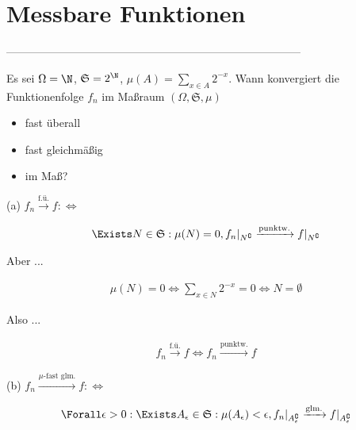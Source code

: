 \setcounter{exercise}{0}

\section{Messbare Funktionen}

--------------------------------------------------------------------------------

\begin{exercise}

Es sei $\Omega = \N$, $\mathfrak{S} = 2^\N$, $\mu(A) = \sum_{x \in A} 2^{-x}$. Wann konvergiert die Funktionenfolge $f_n$ im Maßraum $(\Omega, \mathfrak{S}, \mu)$

\begin{itemize}
  \item[(a)] fast überall
  \item[(b)] fast gleichmäßig
  \item[(c)] im Maß?
\end{itemize}

\end{exercise}

\begin{solution}

(a) $f_n \xrightarrow{\text{f.ü.}} f : \Leftrightarrow$

\begin{align*}
  \Exists N \in \mathfrak{S}:
  \mu(N) = 0,
  f_n|_{N^\complement} \xrightarrow{\text{punktw.}} f|_{N^\complement}
\end{align*}

Aber ...

\begin{align*}
  \mu(N) = 0
  \Leftrightarrow
  \sum_{x \in N} 2^{-x} = 0
  \Leftrightarrow
  N = \emptyset
\end{align*}

Also ...

\begin{align*}
  f_n \xrightarrow{\text{f.ü.}} f
  \Leftrightarrow
  f_n \xrightarrow{\text{punktw.}} f
\end{align*}

\end{solution}

(b) $f_n \xrightarrow{\mu \text{-fast glm.}} f : \Leftrightarrow$

\begin{align*}
  \Forall \epsilon > 0:
  \Exists A_\epsilon \in \mathfrak{S}:
  \mu(A_\epsilon) < \epsilon,
  f_n|_{A_\epsilon^\complement} \xrightarrow{\text{glm.}} f|_{A_\epsilon^\complement}
\end{align*}

